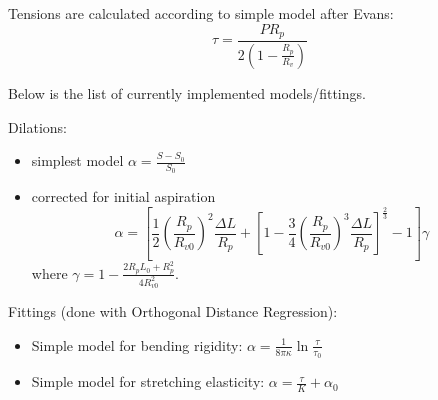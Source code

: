 Tensions are calculated according to simple model after Evans:
\begin{equation}
\tau = \frac{P R_p}{2\left(1-\frac{R_p}{R_v}\right)}
\label{eq:tau-evans}
\end{equation}

Below is the list of currently implemented models/fittings.

Dilations:
\begin{itemize}
	\item simplest model $\alpha = \frac{S-S_0}{S_0}$
	\item corrected for initial aspiration \cite{Henriksen2004}
	\begin{equation}
		\alpha = \left[
		 \frac{1}{2} \left(\frac{R_p}{R_{v0}}\right)^2 \frac{\Delta L}{R_p} 
		 + \left[1-\frac{3}{4}\left(\frac{R_p}{R_{v0}}\right)^3 \frac{\Delta L}{R_p} \right]^{\frac{2}{3}}
		 - 1 
		\right]\gamma
		\label{eq:alpha-henriksen}
	\end{equation}
	where $\displaystyle{\gamma = 1-\frac{2R_p L_0+R_p^2}{4R_{v0}^2}}$.

\end{itemize}

Fittings (done with Orthogonal Distance Regression):
\begin{itemize}
	\item Simple model for bending rigidity: $\alpha=\frac{1}{8\pi\kappa}\ln{\frac{\tau}{\tau_0}}$
	\item Simple model for stretching elasticity: $\alpha=\frac{\tau}{K}+\alpha_0$
\end{itemize}

